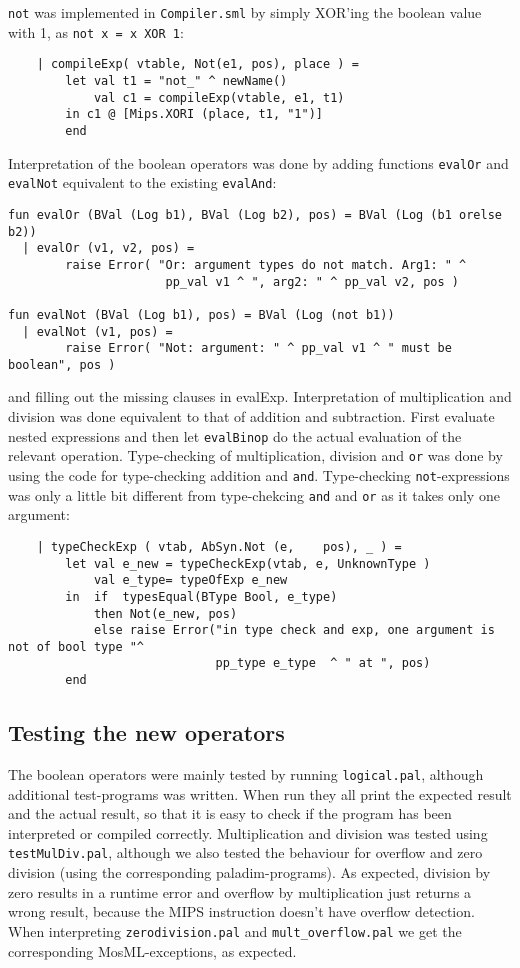 \documentclass{article}
\begin{document}
\texttt{not} was implemented in \texttt{Compiler.sml} by simply XOR'ing the boolean value with 1, as \texttt{not x = x XOR 1}:
\begin{lstlisting}
    | compileExp( vtable, Not(e1, pos), place ) =
        let val t1 = "not_" ^ newName()
            val c1 = compileExp(vtable, e1, t1)
        in c1 @ [Mips.XORI (place, t1, "1")]
        end
\end{lstlisting}
Interpretation of the boolean operators was done by adding functions \texttt{evalOr} and \texttt{evalNot} equivalent to the existing \texttt{evalAnd}:
\begin{lstlisting}
fun evalOr (BVal (Log b1), BVal (Log b2), pos) = BVal (Log (b1 orelse b2))
  | evalOr (v1, v2, pos) =
        raise Error( "Or: argument types do not match. Arg1: " ^
                      pp_val v1 ^ ", arg2: " ^ pp_val v2, pos )

fun evalNot (BVal (Log b1), pos) = BVal (Log (not b1))
  | evalNot (v1, pos) =
        raise Error( "Not: argument: " ^ pp_val v1 ^ " must be boolean", pos )
\end{lstlisting}
and filling out the missing clauses in evalExp.
Interpretation of multiplication and division was done equivalent to that of addition and subtraction. First evaluate nested expressions and then let \texttt{evalBinop} do the actual evaluation of the relevant operation.
Type-checking of multiplication, division and \texttt{or} was done by using the code for type-checking addition and \texttt{and}. Type-checking \texttt{not}-expressions was only a little bit different from type-chekcing \texttt{and} and \texttt{or} as it takes only one argument:
\begin{lstlisting}
    | typeCheckExp ( vtab, AbSyn.Not (e,    pos), _ ) =
        let val e_new = typeCheckExp(vtab, e, UnknownType )
            val e_type= typeOfExp e_new
        in  if  typesEqual(BType Bool, e_type)
            then Not(e_new, pos)
            else raise Error("in type check and exp, one argument is not of bool type "^
                             pp_type e_type  ^ " at ", pos)
        end
\end{lstlisting}

\subsection{Testing the new operators}
The boolean operators were mainly tested by running \texttt{logical.pal}, although additional
test-programs was written. When run they all print the expected result and the actual result,
so that it is easy to check if the program has been interpreted or compiled correctly.
Multiplication and division was tested using \texttt{testMulDiv.pal}, although we also tested
the behaviour for overflow and zero division (using the corresponding paladim-programs). As
expected, division by zero results in a runtime error and overflow by multiplication just
returns a wrong result, because the MIPS instruction doesn't have overflow detection. When
interpreting \texttt{zerodivision.pal} and \texttt{mult\_overflow.pal} we get the corresponding
MosML-exceptions, as expected.
\end{document}
